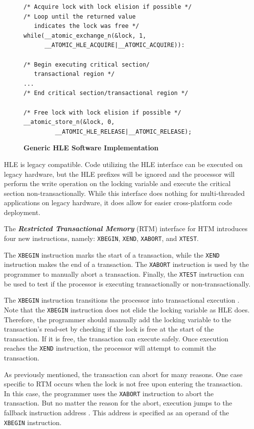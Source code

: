 \documentclass{sig-alternate}
\begin{document}
\begin{figure}
\begin{verbatim}
/* Acquire lock with lock elision if possible */
/* Loop until the returned value 
   indicates the lock was free */
while(__atomic_exchange_n(&lock, 1, 
      __ATOMIC_HLE_ACQUIRE|__ATOMIC_ACQUIRE)):

/* Begin executing critical section/
   transactional region */
...
/* End critical section/transactional region */

/* Free lock with lock elision if possible */
__atomic_store_n(&lock, 0, 
         __ATOMIC_HLE_RELEASE|__ATOMIC_RELEASE);
\end{verbatim}
    \caption{\textbf{Generic HLE Software Implementation}}\label{fig:hle_interface}
\end{figure}

HLE is legacy compatible.  Code utilizing the HLE interface can be executed on legacy
hardware, but the HLE prefixes will be ignored \cite{intel_prog_ref} and the processor
will perform the write operation on the locking variable and execute the critical section
non-transactionally.  While this interface does nothing for multi-threaded applications on
legacy hardware, it does allow for easier cross-platform code deployment.

The \emph{\textbf{Restricted Transactional Memory}} (RTM) interface for HTM introduces
four new instructions, namely: \texttt{XBEGIN}, \texttt{XEND}, \texttt{XABORT}, and
\texttt{XTEST}.

The \texttt{XBEGIN} instruction marks the start of a transaction, while the \texttt{XEND}
instruction makes the end of a transaction.  The \texttt{XABORT} instruction is used by
the programmer to manually abort a transaction.  Finally, the \texttt{XTEST} instruction
can be used to test if the processor is executing transactionally or non-transactionally.

The \texttt{XBEGIN} instruction transitions the processor into transactional execution
\cite{intel_prog_ref}.  Note that the \texttt{XBEGIN} instruction does not elide the
locking variable as HLE does.  Therefore, the programmer should manually add the locking
variable to the transaction's read-set by checking if the lock is free at the start of the
transaction.  If it is free, the transaction can execute safely.  Once execution reaches
the \texttt{XEND} instruction, the processor will attempt to commit the transaction.

As previously mentioned, the transaction can abort for many reasons.  One case specific to
RTM occurs when the lock is not free upon entering the transaction.  In this case, the
programmer uses the \texttt{XABORT} instruction to abort the transaction.  But no matter
the reason for the abort, execution jumps to the fallback instruction address
\cite{intel_prog_ref}.  This address is specified as an operand of the \texttt{XBEGIN}
instruction.
\end{document}
